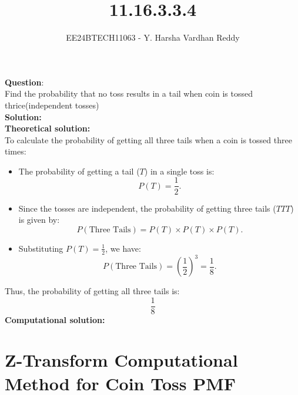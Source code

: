 \documentclass[journal]{IEEEtran}
\begin{document}
	
	
	\vspace{3cm}
	
	\title{11.16.3.3.4}
	\author{EE24BTECH11063 - Y. Harsha Vardhan Reddy }
	{\let\newpage\relax\maketitle}
	
	\renewcommand{\thefigure}{\theenumi}
	\renewcommand{\thetable}{\theenumi}
	\setlength{\intextsep}{10pt} %
	
	
	\renewcommand{\thetable}{\theenumi}
	
	
\textbf{Question}:\\
Find the probability that no toss results in a tail when coin is tossed thrice(independent tosses) \\
\textbf{Solution: }\\
\textbf{Theoretical solution: }\\
To calculate the probability of getting all three tails when a coin is tossed three times:

\begin{itemize}
    \item The probability of getting a tail (\(T\)) in a single toss is:
    \[
    P(T) = \frac{1}{2}.
    \]
    \item Since the tosses are independent, the probability of getting three tails (\(TTT\)) is given by:
    \[
    P(\text{Three Tails}) = P(T) \times P(T) \times P(T).
    \]
    \item Substituting \(P(T) = \frac{1}{2}\), we have:
    \[
    P(\text{Three Tails}) = \left(\frac{1}{2}\right)^3 = \frac{1}{8}.
    \]
\end{itemize}

Thus, the probability of getting all three tails is:
\[
\boxed{\frac{1}{8}}
\]
\textbf{Computational solution: }\\


\section*{Z-Transform Computational Method for Coin Toss PMF}
\end{document}
